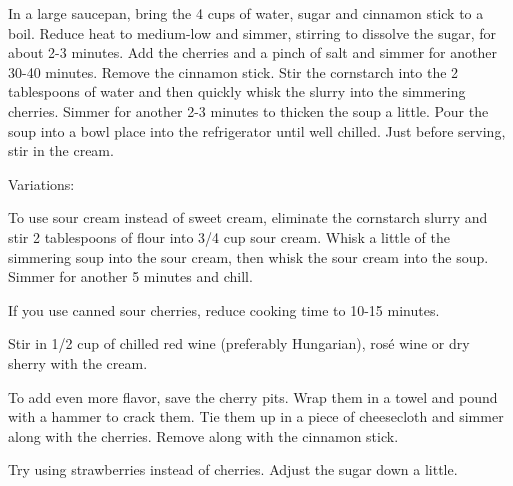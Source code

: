 In a large saucepan, bring the 4 cups of water, sugar and cinnamon stick to a boil.
Reduce heat to medium-low and simmer, stirring to dissolve the sugar, for about 2-3 minutes.
Add the cherries and a pinch of salt and simmer for another 30-40 minutes. Remove the cinnamon stick.
Stir the cornstarch into the 2 tablespoons of water and then quickly whisk the slurry into the simmering cherries. Simmer for another 2-3 minutes to thicken the soup a little.
Pour the soup into a bowl place into the refrigerator until well chilled. 
Just before serving, stir in the cream.

Variations:

To use sour cream instead of sweet cream, eliminate the cornstarch slurry and stir 2 tablespoons of flour into 3/4 cup sour cream. Whisk a little of the simmering soup into the sour cream, then whisk the sour cream into the soup. Simmer for another 5 minutes and chill.

If you use canned sour cherries, reduce cooking time to 10-15 minutes.

Stir in 1/2 cup of chilled red wine (preferably Hungarian), rosé wine or dry sherry with the cream.

To add even more flavor, save the cherry pits. Wrap them in a towel and pound with a hammer to crack them. Tie them up in a piece of cheesecloth and simmer along with the cherries. Remove along with the cinnamon stick.

Try using strawberries instead of cherries. Adjust the sugar down a little.